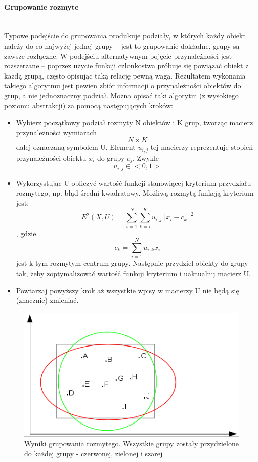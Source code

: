 \documentclass{article}
\newcommand{\myparagraph}[1]{\paragraph{#1}\mbox{}\\}
\begin{document}
\myparagraph{Grupowanie rozmyte}

Typowe podejście do grupowania produkuje podziały, w których każdy obiekt należy do co najwyżej jednej grupy – jest to grupowanie dokładne, grupy są zawsze rozłączne. W podejściu alternatywnym pojęcie przynależności jest rozszerzane – poprzez użycie funkcji członkostwa próbuje się powiązać obiekt z każdą grupą, często opisując taką relację pewną wagą. Rezultatem wykonania takiego algorytmu jest pewien zbiór informacji o przynależności obiektów do grup, a nie jednoznaczny podział. Można opisać taki algorytm (z wysokiego poziomu abstrakcji) za pomocą następujących kroków:

\begin{itemize}
	\item Wybierz początkowy podział rozmyty N obiektów i K grup, tworząc macierz przynależności wymiarach \[N\times K\] dalej oznaczaną symbolem U. Element $u_{i,j}$ tej macierzy reprezentuje stopień przynależności obiektu $x_{i}$ do grupy $c_{j}$. Zwykle \[u_{i,j} \in <0, 1> \]
	\item Wykorzystując U obliczyć wartość funkcji stanowiącej kryterium przydziału rozmytego, np. błąd średni kwadratowy. Możliwą rozmytą funkcją kryterium jest:
	\[E^2(X, U) = \sum_{i=1}^{N}\sum_{k=i}^{K}u_{i,j}||x_{i}-c_{k}||^2 \], gdzie \[ c_{k} = \sum_{i=1}^{N}u_{i,k}x_{i} \] jest k-tym rozmytym centrum grupy. Następnie przydziel obiekty do grupy tak, żeby zoptymalizować wartość funkcji kryterium i uaktualnij macierz U.
	\item Powtarzaj powyższy krok aż wszystkie wpisy w macierzy U nie będą się (znacznie) zmieniać.
\end{itemize}

\begin{figure}
	\centering
	\includegraphics[]{rozmytewyniki.png}
	\caption{Wyniki grupowania rozmytego. Wszystkie grupy zostały przydzielone do każdej grupy - czerwonej, zielonej i szarej}
	\label{fig:rozmytewyniki}
\end{figure}
\end{document}
